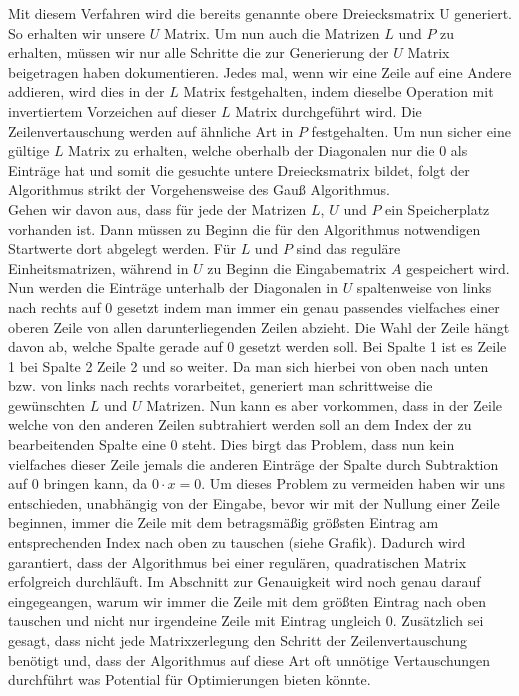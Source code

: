 \documentclass[course=erap]{aspdoc}
\begin{document}
Mit diesem Verfahren wird die bereits genannte obere Dreiecksmatrix U generiert. So erhalten wir unsere $U$ Matrix. 
Um nun auch die Matrizen $L$ und $P$ zu erhalten, müssen wir nur alle Schritte die zur Generierung 
der $U$ Matrix beigetragen haben dokumentieren. Jedes mal, wenn wir eine Zeile auf eine Andere addieren,
wird dies in der $L$ Matrix festgehalten, indem dieselbe Operation mit invertiertem Vorzeichen auf dieser $L$ Matrix durchgeführt wird. 
Die Zeilenvertauschung werden auf ähnliche Art in $P$ festgehalten. Um nun sicher eine gültige $L$ Matrix zu erhalten, 
welche oberhalb der Diagonalen nur die 0 als Einträge hat und somit die gesuchte untere Dreiecksmatrix bildet, 
folgt der Algorithmus strikt der Vorgehensweise des Gauß Algorithmus.\\

Gehen wir davon aus, dass für jede der Matrizen $L$, $U$ und $P$ ein Speicherplatz vorhanden ist.
Dann müssen zu Beginn die für den Algorithmus notwendigen Startwerte dort abgelegt werden. Für $L$ und $P$ sind das 
reguläre Einheitsmatrizen, während in $U$ zu Beginn die Eingabematrix $A$ gespeichert wird. Nun werden die Einträge unterhalb 
der Diagonalen in $U$ spaltenweise von links nach rechts auf 0 gesetzt indem man immer ein genau passendes vielfaches 
einer oberen Zeile von allen darunterliegenden Zeilen abzieht. Die Wahl der Zeile hängt davon ab, welche Spalte gerade 
auf 0 gesetzt werden soll. Bei Spalte 1 ist es Zeile 1 bei Spalte 2 Zeile 2 und so weiter. Da man sich hierbei von oben 
nach unten bzw. von links nach rechts vorarbeitet, generiert man schrittweise die gewünschten $L$ und $U$ Matrizen. 
Nun kann es aber vorkommen, dass in der Zeile welche von den anderen Zeilen subtrahiert werden soll an dem Index 
der zu bearbeitenden Spalte eine 0 steht. Dies birgt das Problem, dass nun kein vielfaches dieser Zeile jemals 
die anderen Einträge der Spalte durch Subtraktion auf 0 bringen kann, da $ 0 \cdot x = 0$. Um dieses Problem zu vermeiden 
haben wir uns entschieden, unabhängig von der Eingabe, bevor wir mit der Nullung einer Zeile beginnen, immer die Zeile mit dem betragsmäßig größsten Eintrag
am entsprechenden Index nach oben zu tauschen (siehe Grafik). Dadurch wird garantiert, dass der Algorithmus bei einer 
regulären, quadratischen Matrix erfolgreich durchläuft. Im Abschnitt zur Genauigkeit wird noch genau darauf 
eingegeangen, warum wir immer die Zeile mit dem größten Eintrag nach oben tauschen und nicht nur irgendeine Zeile 
mit Eintrag ungleich 0. Zusätzlich sei gesagt, dass nicht jede Matrixzerlegung den Schritt der Zeilenvertauschung 
benötigt und, dass der Algorithmus auf diese Art oft unnötige Vertauschungen durchführt was Potential für 
Optimierungen bieten könnte\cite[10-13]{M1977}.\\
 
\end{document}
